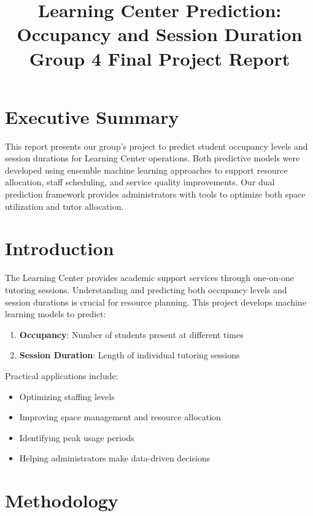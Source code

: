\documentclass[12pt,letterpaper]{article}
\title{\LARGE \textbf{Learning Center Prediction: Occupancy and Session Duration\\Group 4 Final Project Report}}
\author{}
\date{}
\begin{document}
\maketitle

\section*{Executive Summary}

This report presents our group's project to predict student occupancy levels and session durations for Learning Center operations. Both predictive models were developed using ensemble machine learning approaches to support resource allocation, staff scheduling, and service quality improvements. Our dual prediction framework provides administrators with tools to optimize both space utilization and tutor allocation.

\tableofcontents
\newpage

\section{Introduction}

The Learning Center provides academic support services through one-on-one tutoring sessions. Understanding and predicting both occupancy levels and session durations is crucial for resource planning. This project develops machine learning models to predict:

\begin{enumerate}
    \item \textbf{Occupancy}: Number of students present at different times
    \item \textbf{Session Duration}: Length of individual tutoring sessions
\end{enumerate}

Practical applications include:
\begin{itemize}
    \item Optimizing staffing levels
    \item Improving space management and resource allocation
    \item Identifying peak usage periods
    \item Helping administrators make data-driven decisions
\end{itemize}

\section{Methodology}
\end{document}
